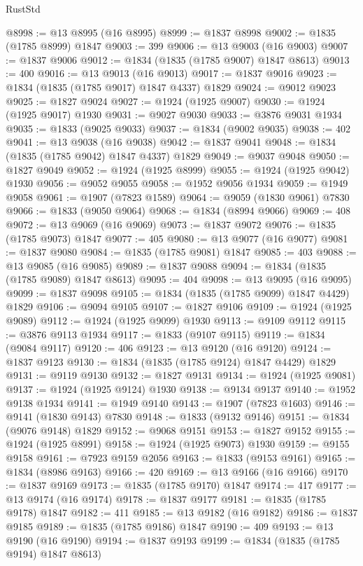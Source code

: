\begin{lexlean}{RustStd}
\begin{coremodule}
{\begin{coremodule}
{{{{{@8998 := @13 @8995 (@16 @8995)
@8999 := @1837 @8998
@9002 := @1835 (@1785 @8999) @1847
@9003 := 399
@9006 := @13 @9003 (@16 @9003)
@9007 := @1837 @9006
@9012 := @1834 (@1835 (@1785 @9007) @1847 @8613)
@9013 := 400
@9016 := @13 @9013 (@16 @9013)
@9017 := @1837 @9016
@9023 := @1834 (@1835 (@1785 @9017) @1847 @4337) @1829
@9024 := @9012 @9023
@9025 := @1827 @9024
@9027 := @1924 (@1925 @9007)
@9030 := @1924 (@1925 @9017) @1930
@9031 := @9027 @9030
@9033 := @3876 @9031 @1934
@9035 := @1833 (@9025 @9033)
@9037 := @1834 (@9002 @9035)
@9038 := 402
@9041 := @13 @9038 (@16 @9038)
@9042 := @1837 @9041
@9048 := @1834 (@1835 (@1785 @9042) @1847 @4337) @1829
@9049 := @9037 @9048
@9050 := @1827 @9049
@9052 := @1924 (@1925 @8999)
@9055 := @1924 (@1925 @9042) @1930
@9056 := @9052 @9055
@9058 := @1952 @9056 @1934
@9059 := @1949 @9058
@9061 := @1907 (@7823 @1589)
@9064 := @9059 (@1830 @9061) @7830
@9066 := @1833 (@9050 @9064)
@9068 := @1834 (@8994 @9066)
@9069 := 408
@9072 := @13 @9069 (@16 @9069)
@9073 := @1837 @9072
@9076 := @1835 (@1785 @9073) @1847
@9077 := 405
@9080 := @13 @9077 (@16 @9077)
@9081 := @1837 @9080
@9084 := @1835 (@1785 @9081) @1847
@9085 := 403
@9088 := @13 @9085 (@16 @9085)
@9089 := @1837 @9088
@9094 := @1834 (@1835 (@1785 @9089) @1847 @8613)
@9095 := 404
@9098 := @13 @9095 (@16 @9095)
@9099 := @1837 @9098
@9105 := @1834 (@1835 (@1785 @9099) @1847 @4429) @1829
@9106 := @9094 @9105
@9107 := @1827 @9106
@9109 := @1924 (@1925 @9089)
@9112 := @1924 (@1925 @9099) @1930
@9113 := @9109 @9112
@9115 := @3876 @9113 @1934
@9117 := @1833 (@9107 @9115)
@9119 := @1834 (@9084 @9117)
@9120 := 406
@9123 := @13 @9120 (@16 @9120)
@9124 := @1837 @9123
@9130 := @1834 (@1835 (@1785 @9124) @1847 @4429) @1829
@9131 := @9119 @9130
@9132 := @1827 @9131
@9134 := @1924 (@1925 @9081)
@9137 := @1924 (@1925 @9124) @1930
@9138 := @9134 @9137
@9140 := @1952 @9138 @1934
@9141 := @1949 @9140
@9143 := @1907 (@7823 @1603)
@9146 := @9141 (@1830 @9143) @7830
@9148 := @1833 (@9132 @9146)
@9151 := @1834 (@9076 @9148) @1829
@9152 := @9068 @9151
@9153 := @1827 @9152
@9155 := @1924 (@1925 @8991)
@9158 := @1924 (@1925 @9073) @1930
@9159 := @9155 @9158
@9161 := @7923 @9159 @2056
@9163 := @1833 (@9153 @9161)
@9165 := @1834 (@8986 @9163)
@9166 := 420
@9169 := @13 @9166 (@16 @9166)
@9170 := @1837 @9169
@9173 := @1835 (@1785 @9170) @1847
@9174 := 417
@9177 := @13 @9174 (@16 @9174)
@9178 := @1837 @9177
@9181 := @1835 (@1785 @9178) @1847
@9182 := 411
@9185 := @13 @9182 (@16 @9182)
@9186 := @1837 @9185
@9189 := @1835 (@1785 @9186) @1847
@9190 := 409
@9193 := @13 @9190 (@16 @9190)
@9194 := @1837 @9193
@9199 := @1834 (@1835 (@1785 @9194) @1847 @8613)
}}}}}
\end{coremodule}}
\end{coremodule}
\end{lexlean}
